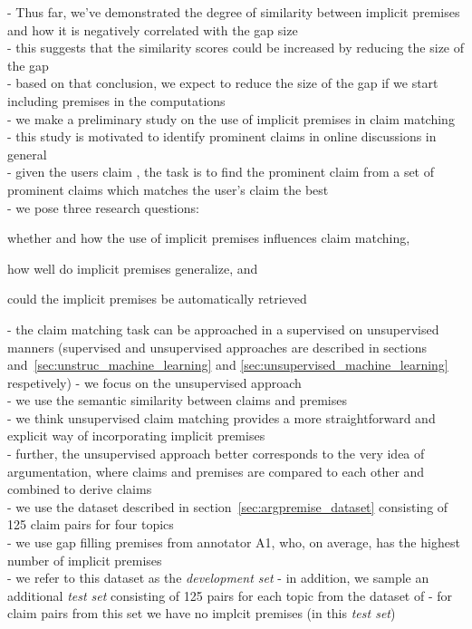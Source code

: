 - Thus far, we've demonstrated the degree of similarity between implicit 
premises and how it is negatively correlated with the gap size \\
- this suggests that the similarity scores could be increased by reducing the size 
of the gap \\
- based on that conclusion, we expect to reduce the size of the gap if we start
including premises in the computations \\
- we make a preliminary study on the use of implicit premises in claim matching \\
- this study is motivated to identify prominent claims in online discussions in general \\
- given the users claim , the task is to find the prominent claim from a set of 
prominent claims which matches the user's claim the best \\
- we pose three research questions: 
\begin{enumerate*}[label=(\arabic*)]
\item whether and how the use of implicit premises influences claim matching, 
\item how well do implicit premises generalize, and 
\item could the implicit premises be automatically retrieved 
\end{enumerate*}

\noindent - the claim matching task can be approached in a supervised on 
unsupervised manners (supervised and unsupervised approaches are described in 
sections and~\ref{sec:unstruc_machine_learning} and
\ref{sec:unsupervised_machine_learning} respetively)
- we focus on the unsupervised approach \\
- we use the semantic similarity between claims and premises \\
- we think unsupervised claim matching provides a more straightforward and explicit way
of incorporating implicit premises \\
- further, the unsupervised approach better corresponds to the very idea of argumentation, 
where claims and premises are compared to each other and combined to derive claims \\

\noindent - we use the dataset described in section~\ref{sec:argpremise_dataset} 
consisting of 125 claim pairs for four topics \\
- we use gap filling premises from annotator A1, who, on average, has the highest number of 
implicit premises \\
- we refer to this dataset as the \emph{development set}
- in addition, we sample an additional \emph{test set} consisting of 125 pairs for each topic
from the dataset of \citet{hasan2014you}
- for claim pairs from this set we have no
implcit premises (in this \emph{test set}) \\

